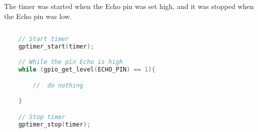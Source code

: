 \documentclass[../report.tex]{subfiles}
\begin{document}
The timer was started when the Echo pin was set high, and it was
 stopped when the Echo pin was low.

 \begin{lstlisting}[language=c,caption={The timer's codeh},label={code:ultrasonic}]
    
    // Start timer 
    gptimer_start(timer);

    // While the pin Echo is high
    while (gpio_get_level(ECHO_PIN) == 1){

        //  do nothing

    }

    // Stop timer
    gptimer_stop(timer);



\end{lstlisting}
\end{document}
